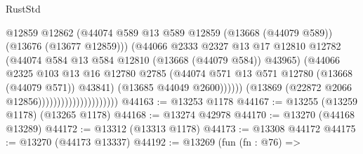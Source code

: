 \begin{lexlean}{RustStd}
\begin{coremodule}
                                                @12859
                                                @12862
                                                (@44074
                                                  @589
                                                  @13
                                                  @589
                                                  @12859
                                                  (@13668 (@44079 @589))
                                                  (@13676 (@13677 @12859)))
                                                (@44066
                                                  @2333
                                                  @2327
                                                  @13
                                                  @17
                                                  @12810
                                                  @12782
                                                  (@44074
                                                    @584
                                                    @13
                                                    @584
                                                    @12810
                                                    (@13668 (@44079 @584))
                                                    @43965)
                                                  (@44066
                                                    @2325
                                                    @103
                                                    @13
                                                    @16
                                                    @12780
                                                    @2785
                                                    (@44074
                                                      @571
                                                      @13
                                                      @571
                                                      @12780
                                                      (@13668 (@44079 @571))
                                                      @43841)
                                                    (@13685 @44049 @2600))))))
                                          (@13869 (@22872 @2066 @12856)))))))))))))))))))))
@44163 := @13253 @1178
@44167 := @13255 (@13259 @1178) (@13265 @1178)
@44168 := @13274 @42978
@44170 := @13270 (@44168 @13289)
@44172 := @13312 (@13313 @1178)
@44173 := @13308 @44172
@44175 := @13270 (@44173 @13337)
@44192 := @13269
    (fun (fn : @76) =>

\end{coremodule}
\end{lexlean}
